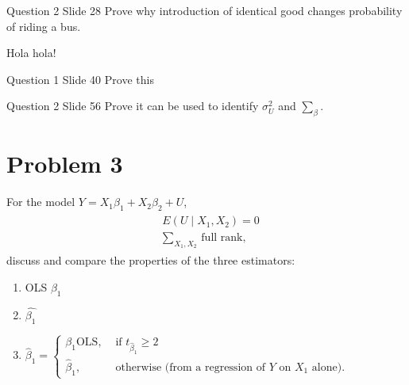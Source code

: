 \documentclass{article}
\begin{document}
\begin{problem}{Question 2 Slide 28}
Prove why introduction of identical good changes probability of riding a bus.
\end{problem}
\begin{solution}
Hola hola!
\end{solution}


\begin{problem}{Question 1 Slide 40}
Prove this
\end{problem}
\begin{solution}
\end{solution}

\begin{problem}{Question 2 Slide 56}
Prove it can be used to identify $\sigma_{U}^{2}$ and $\sum_{\beta}$.
\end{problem}
\begin{solution}
\end{solution}

\newpage

\section*{Problem 3}
 For the model $Y=X_{1} \beta_{1}+X_{2} \beta_{2}+U$,
\begin{align*}
\begin{aligned}
&E\left(U \mid X_{1}, X_{2}\right)=0 \\
&\sum_{X_{1}, X_{2}} \text { full rank, }
\end{aligned}
\end{align*}
discuss and compare the properties of the three estimators: \\
\begin{enumerate}[label=(\alph*)]
    \item OLS $\beta_1$
    \item $\hat{\beta_1}$
    \item $\hat{\beta}_1=\begin{cases}
            \beta_{1} \mathrm{OLS}, & \text { if } t_{\hat{\beta}_{1}} \geq 2 \\ 
            \hat{\beta}_{1}, & \text{ otherwise (from a regression of } Y \text{ on } X_{1} \text { alone). }
        \end{cases}    $
\end{enumerate}
\end{document}
